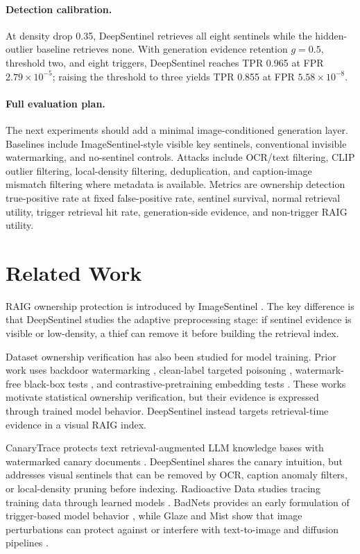 \documentclass[letterpaper]{article}
\begin{document}
\paragraph{Detection calibration.}
At density drop 0.35, DeepSentinel retrieves all eight sentinels while the
hidden-outlier baseline retrieves none. With generation evidence retention
$g=0.5$, threshold two, and eight triggers, DeepSentinel reaches TPR 0.965 at
FPR $2.79\times 10^{-5}$; raising the threshold to three yields TPR 0.855 at
FPR $5.58\times 10^{-8}$.

\paragraph{Full evaluation plan.}
The next experiments should add a minimal image-conditioned generation layer.
Baselines include ImageSentinel-style visible key sentinels, conventional
invisible watermarking, and no-sentinel controls. Attacks include OCR/text
filtering, CLIP outlier filtering, local-density filtering, deduplication, and
caption-image mismatch filtering where metadata is available. Metrics are
ownership detection true-positive rate at fixed false-positive rate, sentinel
survival, normal retrieval utility, trigger retrieval hit rate, generation-side
evidence, and non-trigger RAIG utility.

\section{Related Work}

RAIG ownership protection is introduced by ImageSentinel
\cite{imagesentinel2025}. The key difference is that DeepSentinel studies the
adaptive preprocessing stage: if sentinel evidence is visible or
low-density, a thief can remove it before building the retrieval index.

Dataset ownership verification has also been studied for model training. Prior
work uses backdoor watermarking \cite{li2023blackboxdov}, clean-label targeted
poisoning \cite{datataggants2025}, watermark-free black-box tests
\cite{zeromark2024}, and contrastive-pretraining embedding tests
\cite{dovcontrastive2025}. These works motivate statistical ownership
verification, but their evidence is expressed through trained model behavior.
DeepSentinel instead targets retrieval-time evidence in a visual RAIG index.

CanaryTrace protects text retrieval-augmented LLM knowledge bases with
watermarked canary documents \cite{canarytrace2026}. DeepSentinel shares the
canary intuition, but addresses visual sentinels that can be removed by OCR,
caption anomaly filters, or local-density pruning before indexing. Radioactive
Data studies tracing training data through learned models \cite{radioactive2020}.
BadNets provides an early formulation of trigger-based model behavior
\cite{badnets2017}, while Glaze and Mist show that image perturbations can
protect against or interfere with text-to-image and diffusion pipelines
\cite{glaze2023,mist2023}.
\end{document}
